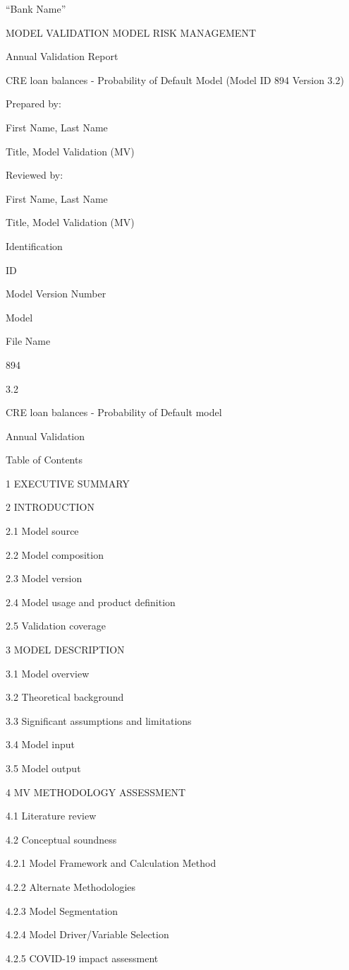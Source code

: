 ``Bank Name''

MODEL VALIDATION MODEL RISK MANAGEMENT

Annual Validation Report

CRE loan balances - Probability of Default Model (Model ID 894 Version
3.2)

Prepared by:

First Name, Last Name

Title, Model Validation (MV)

Reviewed by:

First Name, Last Name

Title, Model Validation (MV)

Identification

ID

Model Version Number

Model

File Name

894

3.2

CRE loan balances - Probability of Default model

Annual Validation

Table of Contents

1 EXECUTIVE SUMMARY

2 INTRODUCTION

2.1 Model source

2.2 Model composition

2.3 Model version

2.4 Model usage and product definition

2.5 Validation coverage

3 MODEL DESCRIPTION

3.1 Model overview

3.2 Theoretical background

3.3 Significant assumptions and limitations

3.4 Model input

3.5 Model output

4 MV METHODOLOGY ASSESSMENT

4.1 Literature review

4.2 Conceptual soundness

4.2.1 Model Framework and Calculation Method

4.2.2 Alternate Methodologies

4.2.3 Model Segmentation

4.2.4 Model Driver/Variable Selection

4.2.5 COVID-19 impact assessment

